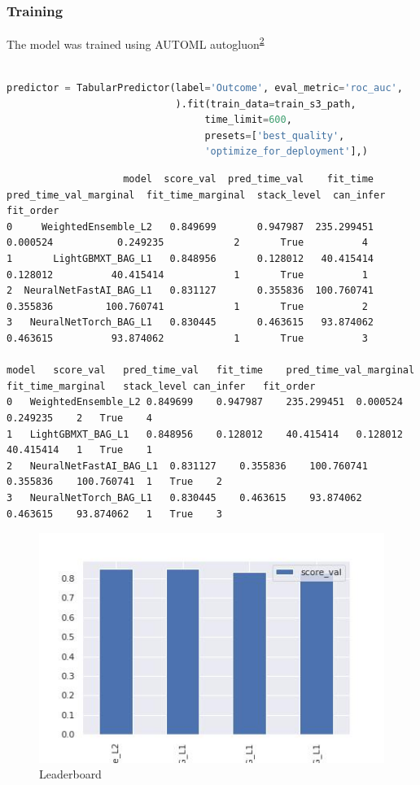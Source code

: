 \documentclass[
]{article}
\begin{document}
\hypertarget{training}{%
\subsubsection{Training}\label{training}}

The model was trained using AUTOML
autogluon\textsuperscript{\protect\hyperlink{ref-auto}{2}}

\begin{lstlisting}[language=python]
%%time

predictor = TabularPredictor(label='Outcome', eval_metric='roc_auc',
                             ).fit(train_data=train_s3_path,
                                  time_limit=600,
                                  presets=['best_quality',
                                  'optimize_for_deployment'],)
\end{lstlisting}

\begin{verbatim}
                    model  score_val  pred_time_val    fit_time  pred_time_val_marginal  fit_time_marginal  stack_level  can_infer  fit_order
0     WeightedEnsemble_L2   0.849699       0.947987  235.299451                0.000524           0.249235            2       True          4
1       LightGBMXT_BAG_L1   0.848956       0.128012   40.415414                0.128012          40.415414            1       True          1
2  NeuralNetFastAI_BAG_L1   0.831127       0.355836  100.760741                0.355836         100.760741            1       True          2
3   NeuralNetTorch_BAG_L1   0.830445       0.463615   93.874062                0.463615          93.874062            1       True          3

model   score_val   pred_time_val   fit_time    pred_time_val_marginal  fit_time_marginal   stack_level can_infer   fit_order
0   WeightedEnsemble_L2 0.849699    0.947987    235.299451  0.000524    0.249235    2   True    4
1   LightGBMXT_BAG_L1   0.848956    0.128012    40.415414   0.128012    40.415414   1   True    1
2   NeuralNetFastAI_BAG_L1  0.831127    0.355836    100.760741  0.355836    100.760741  1   True    2
3   NeuralNetTorch_BAG_L1   0.830445    0.463615    93.874062   0.463615    93.874062   1   True    3
\end{verbatim}

\begin{figure}
\centering
\includegraphics{leaderboard.jpg}
\caption{Leaderboard}
\end{figure}
\end{document}
